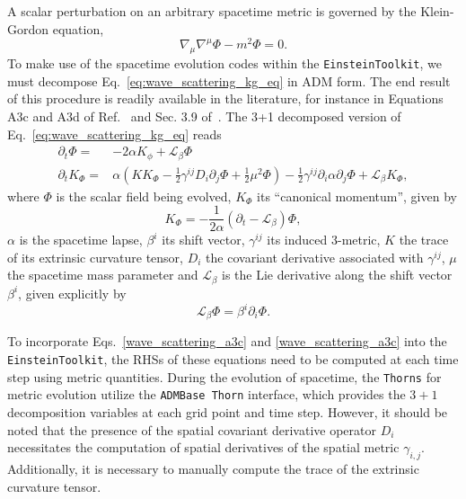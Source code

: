 A scalar perturbation on an arbitrary spacetime metric is governed by the Klein-Gordon equation,
%
\begin{equation}
  \nabla_\mu \nabla^\mu \Phi - m^2 \Phi = 0.
  \label{eq:wave_scattering_kg_eq}
\end{equation}
%
To make use of the spacetime evolution codes within the \texttt{EinsteinToolkit}, we must decompose Eq.~\eqref{eq:wave_scattering_kg_eq} in ADM form. The end result of this procedure is readily available in the literature, for instance in Equations A3c and A3d of Ref.~\cite{PhysRevD.96.104040} and Sec. 3.9 of~\cite{Ficarra2023}. The 3+1 decomposed version of Eq.~\eqref{eq:wave_scattering_kg_eq} reads
%
\begin{align}
  \partial_t \Phi =   & -2 \alpha K_\phi + \mathcal{L}_\beta \Phi \label{eq:wave_scattering_a3c}                                                                                                                                                     \\
  \partial_t K_\Phi = & \alpha \left( K K_\Phi - \frac{1}{2} \gamma^{ij} D_i \partial_j \Phi + \frac{1}{2} \mu^2 \Phi \right) - \frac{1}{2} \gamma^{ij} \partial_i \alpha \partial_j \Phi + \mathcal{L}_\beta K_\Phi, \label{eq:wave_scattering_a3d}
\end{align}
%
where $\Phi$ is the scalar field being evolved, $K_\Phi$ its ``canonical momentum'', given by
%
\begin{equation}
  K_\Phi = -\frac{1}{2\alpha} \left( \partial_t - \mathcal{L}_\beta \right)\Phi,
  \label{eq:wave_scattering_a2}
\end{equation}
%
$\alpha$ is the spacetime lapse, $\beta^i$ its shift vector, $\gamma^{ij}$ its induced 3-metric, $K$ the trace of its extrinsic curvature tensor, $D_i$ the covariant derivative associated with $\gamma^{ij}$, $\mu$ the spacetime mass parameter and $\mathcal{L}_\beta$ is the Lie derivative along the shift vector $\beta^i$, given explicitly by
%
\begin{equation}
  \mathcal{L}_\beta\Phi = \beta^i \partial_i \Phi.
  \label{eq:wave_scattering_lie_derivative}
\end{equation}

To incorporate Eqs.~\eqref{wave_scattering_a3c} and \eqref{wave_scattering_a3c} into the \texttt{EinsteinToolkit}, the RHSs of these equations need to be computed at each time step using metric quantities. During the evolution of spacetime, the \texttt{Thorns} for metric evolution utilize the \texttt{ADMBase Thorn} interface, which provides the $3+1$ decomposition variables at each grid point and time step. However, it should be noted that the presence of the spatial covariant derivative operator $D_i$ necessitates the computation of spatial derivatives of the spatial metric $\gamma_{i,j}$. Additionally, it is necessary to manually compute the trace of the extrinsic curvature tensor.

